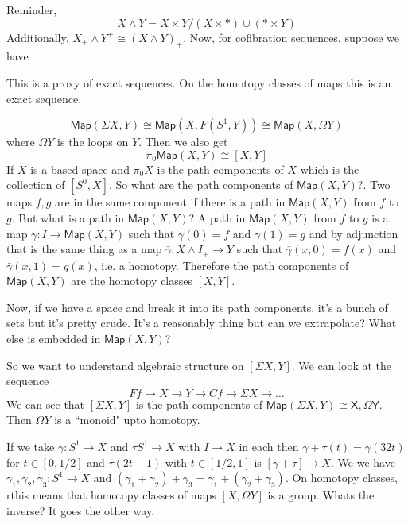 \documentclass[10pt]{article}
\theoremstyle{definition}
\begin{document}
	Reminder, \[
	X\wedge Y =X\times Y/\left(X\times \ast \right)\cup (\ast \times Y)
	\]
	Additionally, $X_+\wedge Y^+\cong (X\wedge Y)_+$. Now, for cofibration sequences, suppose we have
	\begin{center}
	\end{center}
	This is a proxy of exact sequences. On the homotopy classes of maps this is an exact sequence. 
	
	\[
	\mathsf{Map}(\Sigma X, Y)\cong \mathsf{Map}(X,F(S^1,Y))\cong \mathsf{Map}(X,\Omega Y)
	\]
	where $\Omega Y$ is the loops on $Y$. Then we also get \[
	\pi_0 \mathsf{Map}(X,Y)\cong [X,Y] 
	\]
	If $X$ is a based space and $\pi_0 X$ is the path components of $X$ which is the collection of $[S^0,X]$. So what are the path components of $\mathsf{Map}(X,Y)$?. Two maps $f,g$ are in the same component if there is a path in $\mathsf{Map}(X,Y)$ from $f$ to $g$. But what is a path in $\mathsf{Map}(X,Y)$? A path in $\mathsf{Map}(X,Y)$ from $f$ to $g$ is a map $\gamma:I\to \mathsf{Map}(X,Y)$ such that $\gamma(0)=f$ and $\gamma(1)=g$ and by adjunction that is the same thing as a map $\bar\gamma:X\wedge I_+ \to Y$ such that $\bar\gamma(x,0)= f(x)$ and $\bar\gamma(x,1)=g(x)$, i.e. a homotopy. Therefore the path components of $\mathsf{Map}(X,Y)$ are the homotopy classes $[X,Y]$.
	
	Now, if we have a space and break it into its path components, it's a bunch of sets but it's pretty crude. It's a reasonably thing but can we extrapolate? What else is embedded in $\mathsf{Map}(X,Y)$?
	
	So we want to understand algebraic structure on $[\Sigma X, Y]$. We can look at the sequence \[
	Ff\to X\to Y \to Cf\to \Sigma X\to \dots 
	\]
	We can see that $[\Sigma X,Y]$ is the path components of $\mathsf{Map}(\Sigma X,Y)\cong \mathsf{X,\Omega Y}$. Then $\Omega Y$ is a ``monoid" upto homotopy.
	
	If we take $\gamma: S^1\to X$ and $\tau S^1\to X$ with $I\to X$ in each then $\gamma+\tau(t)=\gamma(32t)$ for $t\in [0,1/2]$ and $\tau(2t-1)$ with $t\in [1/2,1]$ is $[\gamma+\tau]\to X$.  We we have $\gamma_1, \gamma_2,\gamma_3: S^1\to X$  and $(\gamma_1+\gamma_2)+\gamma_3=\gamma_1+(\gamma_2+\gamma_3)$. On homotopy classes, rthis means that homotopy classes of maps $[X,\Omega Y]$ is a group. Whats the inverse? It goes the other way. 
	
\end{document}
